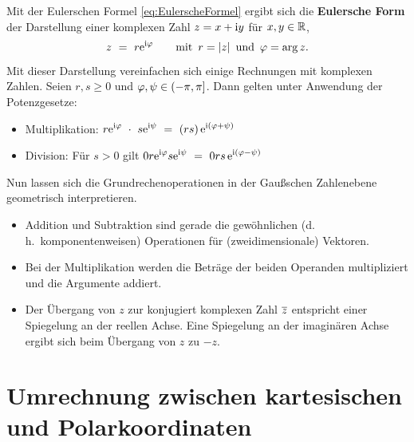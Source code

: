 \noindent Mit der Eulerschen Formel \eqref{eq:EulerscheFormel} ergibt sich die
\textbf{Eulersche Form} der Darstellung einer komplexen Zahl $z=x+\mathrm{i} y$ für
$x,y\in\mathbb{R}$,
\begin{equation}
\label{eq:EulerscheForm}
z
\ =\ r\mathrm{e}^{\mathrm{i}\varphi}
\qquad\text{mit \,$r=\lvert z\rvert$\, und \,$\varphi=\arg{z}$.}
\end{equation}
Mit dieser Darstellung vereinfachen sich einige Rechnungen mit komplexen Zahlen. Seien $r,s\ge0$ und $\varphi,\psi\in({-\pi},{\pi}]$. Dann gelten unter Anwendung der Potenzgesetze:
\begin{itemize}
\addtolength{\itemsep}{-1em}
\item{}Multiplikation:
\;$\displaystyle
r\mathrm{e}^{\mathrm{i}\varphi}\ \cdot\ s\mathrm{e}^{\mathrm{i}\psi}
\ =\ (rs)\,\mathrm{e}^{\mathrm{i}(\varphi+\psi)}
$

\item{}Division: Für $s>0$ gilt
\;$\displaystyle
\frac{r\e^{\imag\varphi}}{s\e^{\imag\psi}}
\ =\ \frac{r}{s}\,\e^{\imag(\varphi-\psi)}
$

\end{itemize}
Nun lassen sich die Grundrechenoperationen in der Gaußschen Zahlenebene
geometrisch interpretieren.
\begin{itemize}
\addtolength{\itemsep}{-1em}
\item{}Addition und Subtraktion sind gerade die gewöhnlichen (d.\,h.\
komponentenweisen) Operationen für (zweidimensionale) Vektoren.

\item{}Bei der Multiplikation werden die Beträge der beiden Operanden
multipliziert und die Argumente addiert.

\item{}Der Übergang von $z$ zur konjugiert komplexen Zahl $\overline{z}$
entspricht einer Spiegelung an der reellen Achse. Eine Spiegelung an der
imaginären Achse ergibt sich beim Übergang von $z$ zu $-z$.

\end{itemize}

\section{Umrechnung zwischen kartesischen und Polarkoordinaten}

